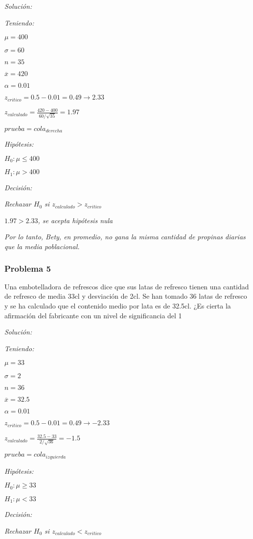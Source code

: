 \documentclass[a4paper, 12pt]{article}
\begin{document}
\emph{Solución:}

\emph{Teniendo:}

$\mu=400$

$\sigma=60$

$n=35$

$\overline{x}=420$

$\alpha=0.01$

$z_{critico}=0.5-0.01=0.49\to 2.33$

$z_{calculado}=\frac{420-400}{60/\sqrt{35}}=1.97$

$prueba=cola_{derecha}$

\emph{Hipótesis:}

$H_0:\mu\leq 400$

$H_1:\mu>400$

\emph{Decisión:}

\emph{Rechazar $H_0$ si $z_{calculado}>z_{critico}$}

$1.97>2.33$\emph{, se acepta hipótesis nula}

\emph{Por lo tanto, Bety, en promedio, no gana la misma cantidad de propinas diarias que la media poblacional.}

\subsubsection{Problema 5}
Una embotelladora de refrescos dice que sus latas de refresco tienen una cantidad de refresco de media 33cl y desviación de 2cl. Se han tomado 36 latas de refresco y se ha calculado que el contenido medio por lata es de 32.5cl. ¿Es cierta la afirmación del fabricante con un nivel de significancia del 1%

\emph{Solución:}

\emph{Teniendo:}

$\mu=33$

$\sigma=2$

$n=36$

$\overline{x}=32.5$

$\alpha=0.01$

$z_{critico}=0.5-0.01=0.49\to -2.33$

$z_{calculado}=\frac{32.5-33}{2/\sqrt{36}}=-1.5$

$prueba=cola_{izquierda}$

\emph{Hipótesis:}

$H_0:\mu\geq 33$

$H_1:\mu<33$

\emph{Decisión:}

\emph{Rechazar $H_0$ si $z_{calculado}<z_{critico}$}
\end{document}
